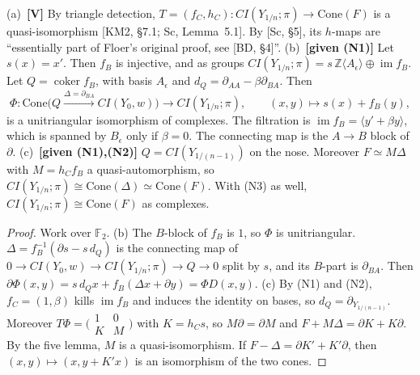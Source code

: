 \begin{theorem}[cone]\label{fp:thm:cone}
(a)~\textbf{[V]} By triangle detection, $T=(f_C,h_C)\colon\mathit{CI}(Y_{1/n};\pi)\to\mathrm{Cone}(F)$ is a
quasi-isomorphism [KM2, \S7.1; Sc, Lemma~5.1].  By [Sc, \S5], its $h$-maps are ``essentially part of Floer's original proof, see
[BD, \S4]''.
(b)~\textbf{[given (N1)]} Let $s(x)=x'$.  Then $f_B$ is injective, and as groups
$\mathit{CI}(Y_{1/n};\pi)=s\,\mathbb Z\langle A_\epsilon\rangle\oplus\operatorname{im}f_B$.  Let $Q=\operatorname{coker}f_B$, with basis $A_\epsilon$ and $d_Q=\partial_{AA}-\beta\partial_{BA}$.  Then
\[\Phi\colon\mathrm{Cone}\big(Q\xrightarrow{\Delta=\partial_{BA}}\mathit{CI}(Y_0,w)\big)\to\mathit{CI}(Y_{1/n};\pi),\qquad
(x,y)\mapsto s(x)+f_B(y),\]
is a unitriangular isomorphism of complexes.  The filtration is $\operatorname{im}f_B=\langle y'+\beta y\rangle$, which is
spanned by $B_\epsilon$ only if $\beta=0$.  The connecting map is the $A\!\to\!B$ block of $\partial$.
(c)~\textbf{[given (N1),(N2)]} $Q=\mathit{CI}(Y_{1/(n-1)})$ on the nose.  Moreover $F\simeq M\Delta$ with
$M=h_Cf_B$ a quasi-automorphism, so $\mathit{CI}(Y_{1/n};\pi)\cong\mathrm{Cone}(\Delta)\simeq\mathrm{Cone}(F)$.  With (N3)
as well, $\mathit{CI}(Y_{1/n};\pi)\cong\mathrm{Cone}(F)$ as complexes.
\end{theorem}
\begin{proof}
Work over $\mathbb F_2$.  (b) The $B$-block of $f_B$ is $1$, so $\Phi$ is unitriangular.  $\Delta=f_B^{-1}(\partial s-s\,d_Q)$ is
the connecting map of $0\to\mathit{CI}(Y_0,w)\to\mathit{CI}(Y_{1/n};\pi)\to Q\to0$ split by $s$, and its $B$-part is $\partial_{BA}$.
Then $\partial\Phi(x,y)=s\,d_Qx+f_B(\Delta x+\partial y)=\Phi D(x,y)$.  (c) By (N1) and (N2), $f_C=(1,\beta)$ kills
$\operatorname{im}f_B$ and induces the identity on bases, so $d_Q=\partial_{Y_{1/(n-1)}}$.  Moreover
$T\Phi=\big(\begin{smallmatrix}1&0\\K&M\end{smallmatrix}\big)$ with $K=h_Cs$, so $M\partial=\partial M$ and $F+M\Delta=\partial K+K\partial$.
By the five lemma, $M$ is a quasi-isomorphism.  If $F-\Delta=\partial K'+K'\partial$, then $(x,y)\mapsto(x,y+K'x)$ is an
isomorphism of the two cones.
\end{proof}

